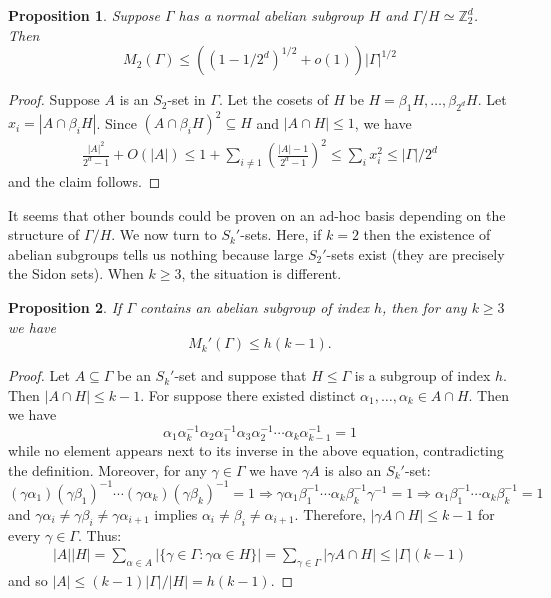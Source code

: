 \documentclass[12pt]{article}
\newtheorem{prop}{Proposition}
\begin{document}
\begin{prop} \label{Quotient has exponent 2}
Suppose $\Gamma$ has a normal abelian subgroup $H$ and $\Gamma/H\simeq\mathbb Z_2^d$. Then
$$M_2(\Gamma)\le((1-1/2^d)^{1/2}+o(1))|\Gamma|^{1/2}$$
\end{prop}
\begin{proof}
    Suppose $A$ is an $S_2$-set in $\Gamma$. Let the cosets of $H$ be $H=\beta_1H,\ldots,\beta_{2^d}H$. Let $x_i=|A\cap\beta_iH|$. Since $(A\cap\beta_iH)^2\subseteq H$ and $|A\cap H|\le 1$, we have
    $$\begin{aligned}
       \frac{|A|^2}{2^d-1}+O(|A|)\le 1+\sum_{i\ne 1}\left(\frac{|A|-1}{2^d-1}\right)^2\le\sum_{i}x_i^2\le|\Gamma|/2^d
    \end{aligned}$$
    and the claim follows.
\end{proof}

It seems that other bounds could be proven on an ad-hoc basis depending on the structure of $\Gamma/H$. We now turn to $S_k'$-sets. Here, if $k=2$ then the existence of abelian subgroups tells us nothing because large $S_2'$-sets exist (they are precisely the Sidon sets). When $k\ge 3$, the situation is different.

\begin{prop} \label{Sk' upper bound}
    If $\Gamma$ contains an abelian subgroup of index $h$, then for any $k\ge 3$ we have
    $$M_k'(\Gamma)\le h(k-1).$$
\end{prop}
\begin{proof}
 Let $A\subseteq\Gamma$ be an $S_k'$-set and suppose that $H\le\Gamma$ is a subgroup of index $h$. Then $|A\cap H|\le k-1$. For suppose there existed distinct $\alpha_1,\ldots,\alpha_k\in A\cap H$. Then we have
$$\alpha_1\alpha_k^{-1}\alpha_2\alpha_1^{-1}\alpha_3\alpha_2^{-1}\cdots\alpha_k\alpha_{k-1}^{-1}=1$$
while no element appears next to its inverse in the above equation, contradicting the definition. Moreover, for any $\gamma\in\Gamma$ we have $\gamma A$ is also an $S_k'$-set:
$$(\gamma\alpha_1)(\gamma\beta_1)^{-1}\cdots(\gamma\alpha_k)(\gamma\beta_k)^{-1}=1\Longrightarrow\gamma\alpha_1\beta_1^{-1}\cdots\alpha_k\beta_k^{-1}\gamma^{-1}=1\Longrightarrow\alpha_1\beta_1^{-1}\cdots\alpha_k\beta_k^{-1}=1$$
and $\gamma\alpha_i\ne\gamma\beta_i\ne\gamma\alpha_{i+1}$ implies $\alpha_i\ne\beta_i\ne\alpha_{i+1}.$ Therefore, $|\gamma A\cap H|\le k-1$ for every $\gamma\in\Gamma$. Thus:
$$\begin{aligned}
    |A||H|=\sum_{\alpha\in A}|\{\gamma\in\Gamma:\gamma\alpha\in H\}|=\sum_{\gamma\in\Gamma}|\gamma A\cap H|\le|\Gamma|(k-1)
\end{aligned}$$
and so $|A|\le(k-1)|\Gamma|/|H|=h(k-1).$ 
\end{proof}
\end{document}
